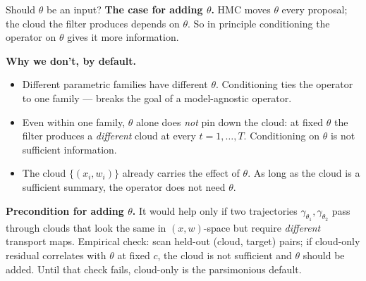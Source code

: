 \documentclass[10pt,aspectratio=169]{beamer}
\begin{document}
\begin{frame}{Should $\theta$ be an input?}
  \textbf{The case for adding $\theta$.} HMC moves $\theta$ every proposal; the cloud the filter produces depends on $\theta$. So in principle conditioning the operator on $\theta$ gives it more information.

  \medskip
  \textbf{Why we don't, by default.}
  \begin{itemize}\setlength{\itemsep}{0.2em}
    \item Different parametric families have different $\theta$. Conditioning ties the operator to one family --- breaks the goal of a model-agnostic operator.
    \item Even within one family, $\theta$ alone does \emph{not} pin down the cloud: at fixed $\theta$ the filter produces a \emph{different} cloud at every $t = 1, \dots, T$. Conditioning on $\theta$ is not sufficient information.
    \item The cloud $\{(x_i, w_i)\}$ already carries the effect of $\theta$. As long as the cloud is a sufficient summary, the operator does not need $\theta$.
  \end{itemize}

  \medskip
  \textbf{Precondition for adding $\theta$.} It would help only if two trajectories $\gamma_{\theta_1}, \gamma_{\theta_2}$ pass through clouds that look the same in $(x, w)$-space but require \emph{different} transport maps. Empirical check: scan held-out (cloud, target) pairs; if cloud-only residual correlates with $\theta$ at fixed $c$, the cloud is not sufficient and $\theta$ should be added. Until that check fails, cloud-only is the parsimonious default.
\end{frame}
\end{document}
